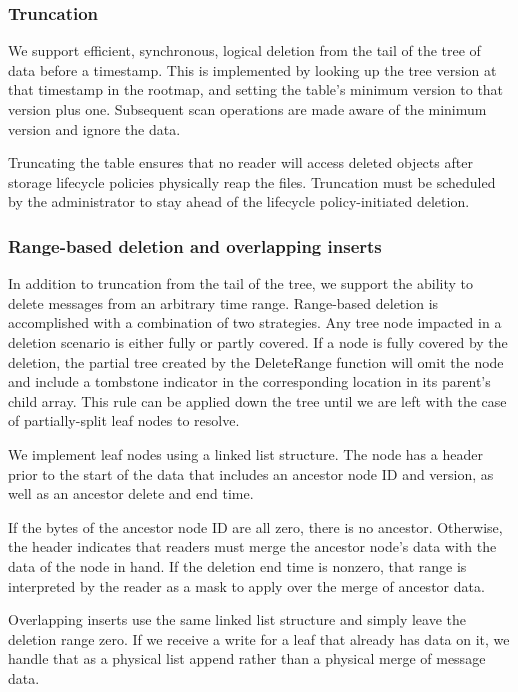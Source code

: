 \documentclass[9pt,twocolumn]{article}
\begin{document}
    \subsubsection{Truncation}
    We support efficient, synchronous, logical deletion from the tail of the tree
    of data before a timestamp. This is implemented by looking up the tree version
    at that timestamp in the rootmap, and setting the table’s minimum version to
    that version plus one. Subsequent scan operations are made aware of the minimum
    version and ignore the data.

    Truncating the table ensures that no reader will access deleted objects after
    storage lifecycle policies physically reap the files. Truncation must be
    scheduled by the administrator to stay ahead of the lifecycle policy-initiated
    deletion.

    \subsubsection{Range-based deletion and overlapping inserts}
    In addition to truncation from the tail of the tree, we support the ability to
    delete messages from an arbitrary time range. Range-based deletion is
    accomplished with a combination of two strategies. Any tree node impacted in a
    deletion scenario is either fully or partly covered. If a node is fully covered
    by the deletion, the partial tree created by the DeleteRange function will omit
    the node and include a tombstone indicator in the corresponding location in its
    parent’s child array. This rule can be applied down the tree until we are left
    with the case of partially-split leaf nodes to resolve.

    We implement leaf nodes using a linked list structure. The node has a header
    prior to the start of the data that includes an ancestor node ID and version,
    as well as an ancestor delete and end time.

    If the bytes of the ancestor node ID are all zero, there is no ancestor.
    Otherwise, the header indicates that readers must merge the ancestor node’s
    data with the data of the node in hand. If the deletion end time is
    nonzero, that range is interpreted by the reader as a mask to apply over
    the merge of ancestor data.

    Overlapping inserts use the same linked list structure and simply leave the
    deletion range zero. If we receive a write for a leaf that already has data on
    it, we handle that as a physical list append rather than a physical merge of
    message data.
\end{document}
